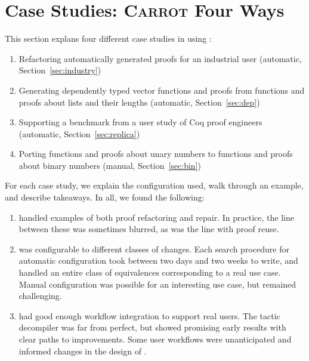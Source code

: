 \section{Case Studies: \textsc{Carrot} Four Ways}
\label{sec:search}

This section explans four different case studies in using \toolname:

\begin{enumerate}
\item Refactoring automatically generated proofs for an industrial user (automatic, Section~\ref{sec:industry})
\item Generating dependently typed vector functions and proofs from functions and proofs about lists and their lengths (automatic, Section~\ref{sec:dep})
\item Supporting a benchmark from a user study of Coq proof engineers (automatic, Section~\ref{sec:replica})
\item Porting functions and proofs about unary numbers to functions and proofs about binary numbers (manual, Section~\ref{sec:bin})
\end{enumerate}
For each case study, we explain the configuration used, walk through an example, and describe takeaways.
In all, we found the following:

\begin{enumerate}
\item \toolname handled examples of both proof refactoring and repair. In practice, the line between these was sometimes
blurred, as was the line with proof reuse.
\item \toolname was configurable to different classes of changes. Each search procedure for automatic configuration
took between two days and two weeks to write, and handled an entire class of equivalences corresponding to a real use case.
Manual configuration was possible for an interesting use case, but remained challenging.
\item \toolname had good enough workflow integration to support real users.
The tactic decompiler was far from perfect, but showed promising early results with clear paths to improvements.
Some user workflows were unanticipated and informed changes in the design of \toolname.
\end{enumerate}


